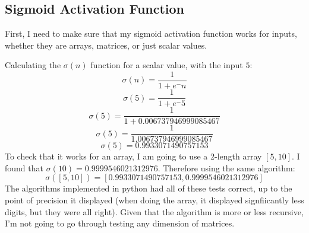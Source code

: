 \documentclass[10pt]{article}
\begin{document}
\subsection{Sigmoid Activation Function}
First, I need to make sure that my sigmoid activation function works for inputs, whether they are arrays, matrices, or just scalar values.\par
Calculating the $\sigma(n)$ function for a scalar value, with the input $5$:
$$\sigma(n) = \frac{1}{1 + e^-n}$$
$$\sigma(5) = \frac{1}{1 + e^-5}$$
$$\sigma(5) = \frac{1}{1 + 0.006737946999085467}$$
$$\sigma(5) = \frac{1}{1.006737946999085467}$$
$$\sigma(5) = 0.9933071490757153$$
To check that it works for an array, I am going to use a 2-length array $[5,10]$. I found that $\sigma(10) = 0.9999546021312976$. Therefore using the same algorithm:
$$\sigma([5,10]) = [0.9933071490757153,0.9999546021312976]$$
The algorithms implemented in python had all of these tests correct, up to the point of precision it displayed (when doing the array, it displayed signfiicantly less digits, but they were all right). Given that the algorithm is more or less recursive, I'm not going to go through testing any dimension of matrices.
\end{document}
